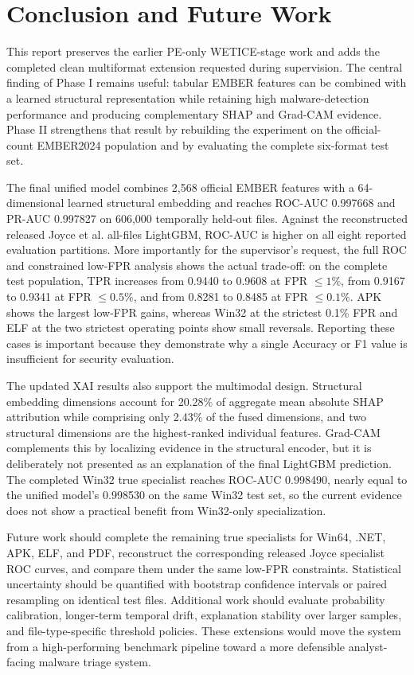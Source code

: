 \documentclass[conference]{IEEEtran}
\begin{document}
\section{Conclusion and Future Work}
\label{section:conclusion-and-futurework}

This report preserves the earlier PE-only WETICE-stage work and adds the completed clean multiformat extension requested during supervision. The central finding of Phase I remains useful: tabular EMBER features can be combined with a learned structural representation while retaining high malware-detection performance and producing complementary SHAP and Grad-CAM evidence. Phase II strengthens that result by rebuilding the experiment on the official-count EMBER2024 population and by evaluating the complete six-format test set.

The final unified model combines 2,568 official EMBER features with a 64-dimensional learned structural embedding and reaches ROC-AUC 0.997668 and PR-AUC 0.997827 on 606,000 temporally held-out files. Against the reconstructed released Joyce et al. all-files LightGBM, ROC-AUC is higher on all eight reported evaluation partitions. More importantly for the supervisor's request, the full ROC and constrained low-FPR analysis shows the actual trade-off: on the complete test population, TPR increases from 0.9440 to 0.9608 at FPR $\leq1\%$, from 0.9167 to 0.9341 at FPR $\leq0.5\%$, and from 0.8281 to 0.8485 at FPR $\leq0.1\%$. APK shows the largest low-FPR gains, whereas Win32 at the strictest 0.1\% FPR and ELF at the two strictest operating points show small reversals. Reporting these cases is important because they demonstrate why a single Accuracy or F1 value is insufficient for security evaluation.

The updated XAI results also support the multimodal design. Structural embedding dimensions account for 20.28\% of aggregate mean absolute SHAP attribution while comprising only 2.43\% of the fused dimensions, and two structural dimensions are the highest-ranked individual features. Grad-CAM complements this by localizing evidence in the structural encoder, but it is deliberately not presented as an explanation of the final LightGBM prediction. The completed Win32 true specialist reaches ROC-AUC 0.998490, nearly equal to the unified model's 0.998530 on the same Win32 test set, so the current evidence does not show a practical benefit from Win32-only specialization.

Future work should complete the remaining true specialists for Win64, .NET, APK, ELF, and PDF, reconstruct the corresponding released Joyce specialist ROC curves, and compare them under the same low-FPR constraints. Statistical uncertainty should be quantified with bootstrap confidence intervals or paired resampling on identical test files. Additional work should evaluate probability calibration, longer-term temporal drift, explanation stability over larger samples, and file-type-specific threshold policies. These extensions would move the system from a high-performing benchmark pipeline toward a more defensible analyst-facing malware triage system.




\end{document}

